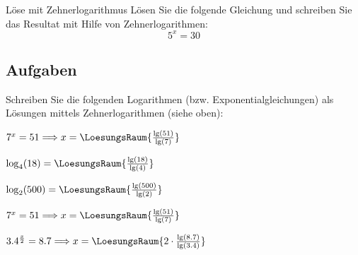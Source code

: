 


\begin{beispiel}{Löse mit Zehnerlogarithmus}{}
  Lösen Sie die folgende Gleichung und schreiben Sie das Resultat mit
  Hilfe von Zehnerlogarithmen:
  $$5^x = 30$$
\end{beispiel}
\newpage

\subsection*{Aufgaben}

Schreiben Sie die folgenden Logarithmen (bzw. Exponentialgleichungen)
als Lösungen mittels Zehnerlogarithmen (siehe oben):


 $7^x = 51 \Longrightarrow x= \LoesungsRaum{\frac{\lg(51)}{\lg(7)}}$


$\log_4(18) = \LoesungsRaum{\frac{\lg(18)}{\lg(4)}}$

$\log_2(500) = \LoesungsRaum{\frac{\lg(500)}{\lg(2)}}$

$7^x = 51 \Longrightarrow x= \LoesungsRaum{\frac{\lg(51)}{\lg(7)}}$

$3.4^\frac{x}2 = 8.7 \Longrightarrow x= \LoesungsRaum{2\cdot{}\frac{\lg(8.7)}{\lg(3.4)}}$
\newpage



%

